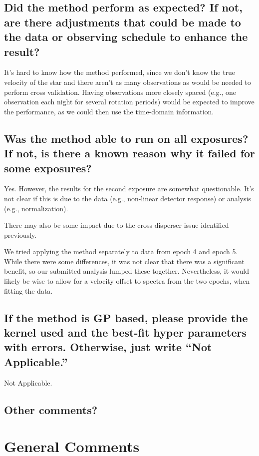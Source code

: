 \documentclass[12pt]{article}
\begin{document}
\subsection{Did the method perform as expected?  If not, are there adjustments that could be made to the data or observing schedule to enhance the result?}

It's hard to know how the method performed, since we don't know the true velocity of the star and there aren't as many observations as would be needed to perform cross validation.
Having observations more closely spaced (e.g., one observation each night for several rotation periods) would be expected to improve the performance, as we could then use the time-domain information.

\subsection{Was the method able to run on all exposures?  If not, is there a known reason why it failed for some exposures?}

Yes.
However, the results for the second exposure are somewhat questionable.
It's not clear if this is due to the data (e.g., non-linear detector response) or analysis (e.g., normalization).

There may also be some impact due to the cross-disperser issue identified previously.

We tried applying the method separately to data from epoch 4 and epoch 5.
While there were some differences, it was not clear that there was a significant benefit, so our submitted analysis lumped these together.
Nevertheless, it would likely be wise to allow for a velocity offset to spectra from the two epochs, when fitting the data.

\subsection{If the method is GP based, please provide the kernel used and the best-fit hyper parameters with errors.  Otherwise, just write ``Not Applicable.''}
Not Applicable.

\subsection{Other comments?}


\section{General Comments}
\end{document}
